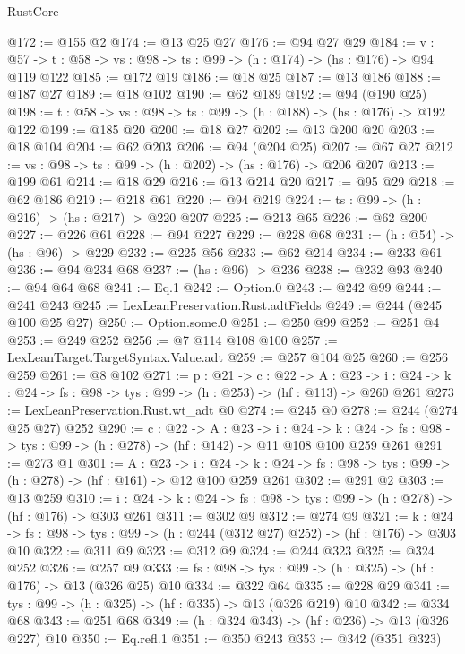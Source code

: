 \begin{lexlean}{RustCore}
\begin{coremodule}
@172 := @155 @2
@174 := @13 @25 @27
@176 := @94 @27 @29
@184 := {v : @57} ->
  {t : @58} -> {vs : @98} -> {ts : @99} -> (h : @174) -> (hs : @176) -> @94 @119 @122
@185 := @172 @19
@186 := @18 @25
@187 := @13 @186
@188 := @187 @27
@189 := @18 @102
@190 := @62 @189
@192 := @94 (@190 @25)
@198 := {t : @58} -> {vs : @98} -> {ts : @99} -> (h : @188) -> (hs : @176) -> @192 @122
@199 := @185 @20
@200 := @18 @27
@202 := @13 @200 @20
@203 := @18 @104
@204 := @62 @203
@206 := @94 (@204 @25)
@207 := @67 @27
@212 := {vs : @98} -> {ts : @99} -> (h : @202) -> (hs : @176) -> @206 @207
@213 := @199 @61
@214 := @18 @29
@216 := @13 @214 @20
@217 := @95 @29
@218 := @62 @186
@219 := @218 @61
@220 := @94 @219
@224 := {ts : @99} -> (h : @216) -> (hs : @217) -> @220 @207
@225 := @213 @65
@226 := @62 @200
@227 := @226 @61
@228 := @94 @227
@229 := @228 @68
@231 := (h : @54) -> (hs : @96) -> @229
@232 := @225 @56
@233 := @62 @214
@234 := @233 @61
@236 := @94 @234 @68
@237 := (hs : @96) -> @236
@238 := @232 @93
@240 := @94 @64 @68
@241 := Eq.{1}
@242 := Option.{0}
@243 := @242 @99
@244 := @241 @243
@245 := LexLeanPreservation.Rust.adtFields
@249 := @244 (@245 @100 @25 @27)
@250 := Option.some.{0}
@251 := @250 @99
@252 := @251 @4
@253 := @249 @252
@256 := @7 @114 @108 @100
@257 := LexLeanTarget.TargetSyntax.Value.adt
@259 := @257 @104 @25
@260 := @256 @259
@261 := @8 @102
@271 := {p : @21} ->
  {c : @22} ->
  {A : @23} ->
  {i : @24} -> {k : @24} -> {fs : @98} -> {tys : @99} -> (h : @253) -> (hf : @113) -> @260 @261
@273 := LexLeanPreservation.Rust.wt_adt @0
@274 := @245 @0
@278 := @244 (@274 @25 @27) @252
@290 := {c : @22} ->
  {A : @23} ->
  {i : @24} ->
  {k : @24} -> {fs : @98} -> {tys : @99} -> (h : @278) -> (hf : @142) -> @11 @108 @100 @259 @261
@291 := @273 @1
@301 := {A : @23} ->
  {i : @24} ->
  {k : @24} -> {fs : @98} -> {tys : @99} -> (h : @278) -> (hf : @161) -> @12 @100 @259 @261
@302 := @291 @2
@303 := @13 @259
@310 := {i : @24} ->
  {k : @24} -> {fs : @98} -> {tys : @99} -> (h : @278) -> (hf : @176) -> @303 @261
@311 := @302 @9
@312 := @274 @9
@321 := {k : @24} ->
  {fs : @98} -> {tys : @99} -> (h : @244 (@312 @27) @252) -> (hf : @176) -> @303 @10
@322 := @311 @9
@323 := @312 @9
@324 := @244 @323
@325 := @324 @252
@326 := @257 @9
@333 := {fs : @98} -> {tys : @99} -> (h : @325) -> (hf : @176) -> @13 (@326 @25) @10
@334 := @322 @64
@335 := @228 @29
@341 := {tys : @99} -> (h : @325) -> (hf : @335) -> @13 (@326 @219) @10
@342 := @334 @68
@343 := @251 @68
@349 := (h : @324 @343) -> (hf : @236) -> @13 (@326 @227) @10
@350 := Eq.refl.{1}
@351 := @350 @243
@353 := @342 (@351 @323)

\end{coremodule}
\end{lexlean}
